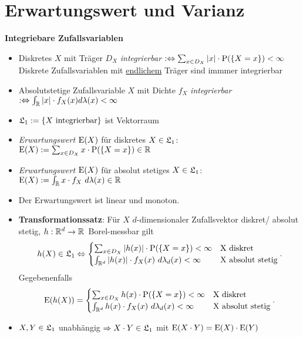 \section{Erwartungswert und Varianz}

\textbf{Integriebare Zufallsvariablen}
\begin{itemize}
\item Diskretes $X$ mit Träger $D_X$ \textit{integrierbar}
$:\Leftrightarrow \sum_{x\in D_X} |x|\cdot \P(\{X=x\})<\infty$\\
Diskrete Zufallsvariablen mit \underline{endlichem} Träger sind immmer integrierbar

\item  Absolutstetige Zufallsvariable $X$ mit Dichte $f_X$ \textit{integrierbar}
\mbox{$:\Leftrightarrow \int_\R |x|\cdot f_X(x)d\lambda(x)<\infty$}

\item $\L_1:=\{X \text{ integrierbar}\}$ ist Vektorraum

\item \textit{Erwartungswert $\E(X)$} für diskretes $X\in\L_1$:
$\E(X):= \sum_{x\in D_X} x\cdot\P(\{X=x\})\in\R$

\item \textit{Erwartungswert $\E(X)$} für absolut stetiges $X\in\L_1$:
$\E(X):= \int_\R x\cdot f_X~d\lambda(x)\in\R$

\item Der Erwartungswert ist linear und monoton.

\item \textbf{Transformationssatz}: Für $X$ $d$-dimensionaler Zufallsvektor diskret/
absolut stetig, \mbox{$h:\R^d\to\R$ Borel-messbar} gilt
\[
	h(X)\in\L_1 \Leftrightarrow
	\begin{cases}
	\sum_{x\in D_X} |h(x)|\cdot\P(\{X=x\})<\infty			& \text{X diskret} \\
	\int_{\R^d} |h(x)|\cdot f_X(x)~d\lambda_d(x)<\infty	& \text{X absolut stetig}
	\end{cases}.
\]
Gegebenenfalls
\[
	\E(h(X))=
	\begin{cases}
	\sum_{x\in D_X} h(x)\cdot\P(\{X=x\})<\infty			& \text{X diskret} \\
	\int_{\R^d} h(x)\cdot f_X(x)~d\lambda_d(x)<\infty		& \text{X absolut stetig}
	\end{cases}.
\]

\item $X,Y\in\L_1$ unabhängig $\Rightarrow X\cdot Y\in\L_1$ mit
$\E(X\cdot Y) = \E(X)\cdot \E(Y)$

\end{itemize}
\hspace{3em}

